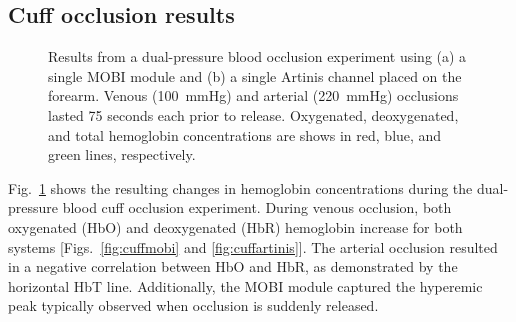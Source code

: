 \subsection{Cuff occlusion results}
\begin{figure}
	\begin{center}
	\end{center}
	\caption{Results from a dual-pressure blood occlusion experiment using (a) a single MOBI module and (b) a single Artinis channel placed on the forearm. Venous (100~mmHg) and arterial (220~mmHg) occlusions lasted 75 seconds each prior to release. Oxygenated, deoxygenated, and total hemoglobin concentrations are shows in red, blue, and green lines, respectively.} 
	\label{fig:cuff}
\end{figure} 
Fig.~\ref{fig:cuff} shows the resulting changes in hemoglobin concentrations during the dual-pressure blood cuff occlusion experiment. During venous occlusion, both oxygenated (HbO) and deoxygenated (HbR) hemoglobin increase for both systems [Figs.~\ref{fig:cuffmobi} and \ref{fig:cuffartinis}]. The arterial occlusion resulted in a negative correlation between HbO and HbR, as demonstrated by the horizontal HbT line. Additionally, the MOBI module captured the hyperemic peak typically observed when occlusion is suddenly released. 


